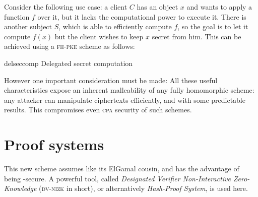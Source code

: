 Consider the following use case: a client $C$ has an object $x$ and wants to apply a function $f$ over it, but it lacks the computational power to execute it. There is another subject $S$, which is able to efficiently compute $f$, so the goal is to let it compute $f(x)$ but the client wishes to keep $x$ secret from him. This can be achieved using a \textsc{fh-pke} scheme as follows:


\begin{cryptosequence}
    {delseccomp}
    {Delegated secret computation}


    \cseqdelay


    \cseqdelay
    \cseqdelay


\end{cryptosequence}


However one important consideration must be made: All these useful characteristics expose an inherent malleability of any fully homomorphic scheme: any attacker can manipulate ciphertexts efficiently, and with some predictable results. This compromises even \textsc{cpa} security of such schemes.

\section{Proof systems}

This new scheme assumes \ddh{} like its ElGamal cousin, and has the advantage of being \cca-secure. A powerful tool, called \emph{Designated Verifier Non-Interactive Zero-Knowledge} (\textsc{dv-nizk} in short), or alternatively \emph{Hash-Proof System}, is used here.


